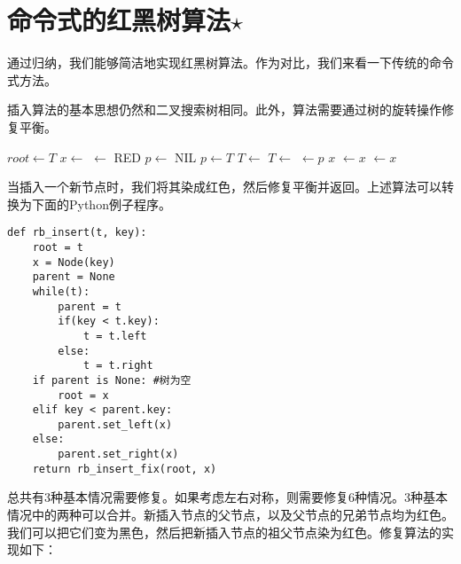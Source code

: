 \documentclass[UTF8]{article}
\begin{document}
\section{命令式的红黑树算法$\star$}

通过归纳，我们能够简洁地实现红黑树算法。作为对比，我们来看一下传统的命令式方法。

插入算法的基本思想仍然和二叉搜索树相同。此外，算法需要通过树的旋转操作修复平衡。

\begin{algorithmic}[1]
  \State $root \gets T$
  \State $x \gets$ 
  \State {} $\gets$ RED
  \State $p \gets$ NIL
    \State $p \gets T$
      \State $T \gets $ 
    \Else
      \State $T \gets $ 
    \EndIf
  \EndWhile
  \State {} $\gets p$
   
    \State \Return $x$
    \State {} $\gets x$
  \Else
    \State {} $\gets x$
  \EndIf
  \State \Return {}
\EndFunction
\end{algorithmic}

当插入一个新节点时，我们将其染成红色，然后修复平衡并返回。上述算法可以转换为下面的Python例子程序。

\lstset{language=Python}
\begin{lstlisting}
def rb_insert(t, key):
    root = t
    x = Node(key)
    parent = None
    while(t):
        parent = t
        if(key < t.key):
            t = t.left
        else:
            t = t.right
    if parent is None: #树为空
        root = x
    elif key < parent.key:
        parent.set_left(x)
    else:
        parent.set_right(x)
    return rb_insert_fix(root, x)
\end{lstlisting}

总共有3种基本情况需要修复。如果考虑左右对称，则需要修复6种情况。3种基本情况中的两种可以合并。新插入节点的父节点，以及父节点的兄弟节点均为红色。我们可以把它们变为黑色，然后把新插入节点的祖父节点染为红色。修复算法的实现如下：
\end{document}
